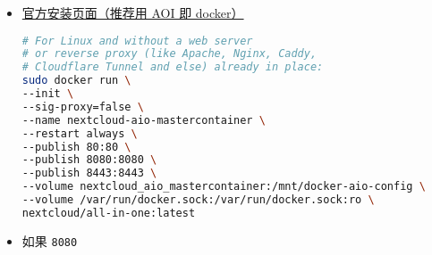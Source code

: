 
\begin{itemize}
\item \href{https://nextcloud.com/install/}{官方安装页面（推荐用 AOI 即 docker）}
\begin{lstlisting}[language=bash]
# For Linux and without a web server
# or reverse proxy (like Apache, Nginx, Caddy,
# Cloudflare Tunnel and else) already in place:
sudo docker run \
--init \
--sig-proxy=false \
--name nextcloud-aio-mastercontainer \
--restart always \
--publish 80:80 \
--publish 8080:8080 \
--publish 8443:8443 \
--volume nextcloud_aio_mastercontainer:/mnt/docker-aio-config \
--volume /var/run/docker.sock:/var/run/docker.sock:ro \
nextcloud/all-in-one:latest
\end{lstlisting}
\item 如果 \verb`8080`
\end{itemize}
